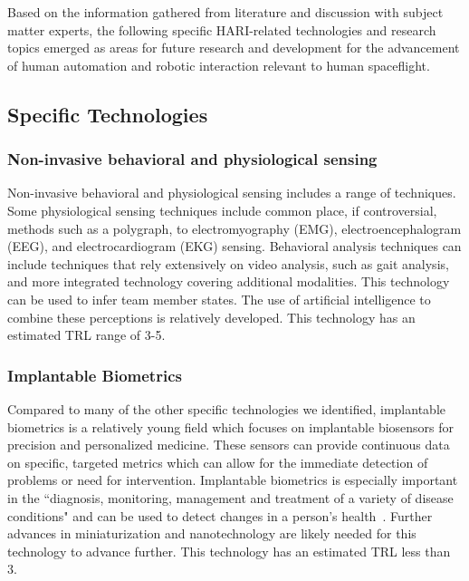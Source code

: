 Based on the information gathered from literature and discussion with subject matter experts, the following specific HARI-related technologies and research topics emerged as areas for future research and development for the advancement of human automation and robotic interaction relevant to human spaceflight.

\subsection{Specific Technologies}
\subsubsection{Non-invasive behavioral and physiological sensing}
Non-invasive behavioral and physiological sensing includes a range of techniques.
Some physiological sensing techniques include common place, if controversial, methods such as a polygraph, to electromyography (EMG), electroencephalogram (EEG), and electrocardiogram (EKG) sensing.
Behavioral analysis techniques can include techniques that rely extensively on video analysis, such as gait analysis, and more integrated technology covering additional modalities.
This technology can be used to infer team member states.
The use of artificial intelligence to combine these perceptions is relatively developed.
This technology has an estimated TRL range of 3-5.

\subsubsection{Implantable Biometrics}
Compared to many of the other specific technologies we identified, implantable biometrics is a relatively young field which focuses on implantable biosensors for precision and personalized medicine.
These sensors can provide continuous data on specific, targeted metrics which can allow for the immediate detection of problems or need for intervention.
Implantable biometrics is especially important in the ``diagnosis, monitoring, management and treatment of a variety of disease conditions" and can be used to detect changes in a person's health~\citep{fitts_human_1951}.
Further advances in miniaturization and nanotechnology are likely needed for this technology to advance further.
This technology has an estimated TRL less than 3.

